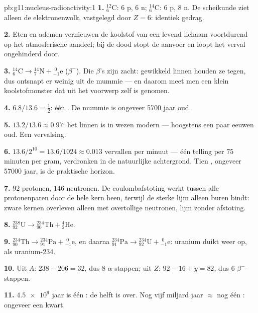 \begin{solution}{pb:g11:nucleus-radioactivity:1}
\textbf{1.} ${}^{12}_{6}\mathrm{C}$: $6$ p, $6$ n;
${}^{14}_{6}\mathrm{C}$: $6$ p, $8$ n. De scheikunde ziet alleen de
elektronenwolk, vastgelegd door $Z = 6$: identiek gedrag.

\textbf{2.} Eten en ademen vernieuwen de koolstof van een levend lichaam
voortdurend op het atmosferische aandeel; bij de dood stopt de aanvoer en
loopt het verval ongehinderd door.

\textbf{3.} ${}^{14}_{6}\mathrm{C} \to {}^{14}_{7}\mathrm{N} +
{}^{\;0}_{-1}\mathrm{e}$ ($\beta^-$). Die $\beta$'s zijn zacht: 
gewikkeld linnen houden ze tegen, dus ontsnapt er weinig uit de mummie
--- en daarom meet men een klein koolstofmonster dat uit het voorwerp
zelf is genomen.

\textbf{4.} $6.8/13.6 = \frac12$: één . De mummie is
ongeveer \num{5700} jaar oud.

\textbf{5.} $13.2/13.6 \approx 0.97$: het linnen is in wezen modern ---
hoogstens een paar eeuwen oud. Een vervalsing.

\textbf{6.} $13.6/2^{10} = 13.6/1024 \approx 0.013$ vervallen per minuut
--- één telling per $75$ minuten per gram, verdronken in de natuurlijke
achtergrond. Tien , ongeveer \num{57000} jaar, is de
praktische horizon.

\textbf{7.} $92$ protonen, $146$ neutronen. De coulombafstoting werkt
tussen alle protonenparen door de hele kern heen, terwijl de sterke lijm
alleen buren bindt: zware kernen overleven alleen met overtollige
neutronen, lijm zonder afstoting.

\textbf{8.} ${}^{238}_{92}\mathrm{U} \to {}^{234}_{90}\mathrm{Th} +
{}^{4}_{2}\mathrm{He}$.

\textbf{9.} ${}^{234}_{90}\mathrm{Th} \to {}^{234}_{91}\mathrm{Pa} +
{}^{\;0}_{-1}\mathrm{e}$, en daarna
${}^{234}_{91}\mathrm{Pa} \to {}^{234}_{92}\mathrm{U} +
{}^{\;0}_{-1}\mathrm{e}$: uranium duikt weer op, als uranium-234.

\textbf{10.} Uit $A$: $238 - 206 = 32$, dus $8$ $\alpha$-stappen; uit
$Z$: $92 - 16 + y = 82$, dus $6$ $\beta^-$-stappen.

\textbf{11.} $\num{4.5e9}$ jaar is één : de helft is over.
Nog vijf miljard jaar $\approx$ nog één : ongeveer een
kwart.


\end{solution}
